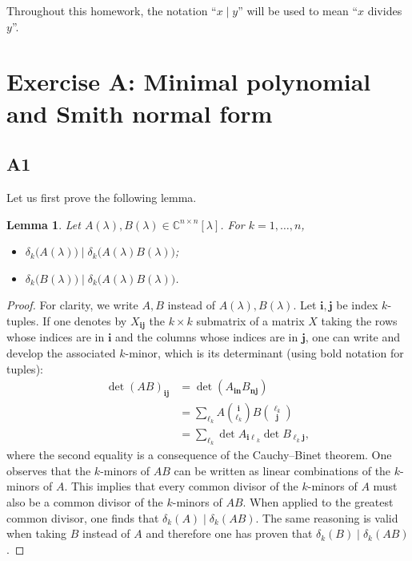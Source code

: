 \documentclass[11pt]{article}
\newtheorem*{lemma}{Lemma}
\newcommand{\complex}{\mathbb{C}} %
\begin{document}
Throughout this homework, the notation ``\(x \mid y\)'' will be used to mean ``\(x\) divides \(y\)''.
\section*{Exercise A: Minimal polynomial and Smith normal form}
\subsection*{A1}
Let us first prove the following lemma.
\begin{lemma}
 Let $A(\lambda), B(\lambda) \in\complex^{n\times n}[\lambda]$.
 For $k=1, \dots, n$,
 \begin{itemize}
     \item $\delta_k\big(A(\lambda)\big) \mid \delta_k\big(A(\lambda)B(\lambda)\big)$;
     \item $\delta_k\big(B(\lambda)\big) \mid \delta_k\big(A(\lambda)B(\lambda)\big)$.
 \end{itemize}
\end{lemma}
\begin{proof}
For clarity, we write \(A, B\) instead of \(A(\lambda), B(\lambda)\).
Let \(\bm{i}, \bm{j}\) be index \(k\)-tuples.
If one denotes by $X_{\bm{ij}}$ the \(k \times k\) submatrix of a matrix $X$ taking the rows whose indices are in $\bm{i}$ and the columns whose indices are in $\bm{j}$, one can write and develop the associated \(k\)-minor, which is its determinant (using bold notation for tuples):
\begin{align*}
    \det (AB)_{\bm{ij}}&=\det(A_{\bm{in}}B_{\bm{nj}})\\
    &=\sum_{\bm{\ell}_k} A\binom{\bm{i}}{\bm{\ell}_k}B\binom{\bm{\ell}_k}{\bm{j}}\\
    &=\sum_{\bm{\ell}_k} \det A_{\bm{i\ell}_k} \det B_{\bm{\ell}_k \bm{j}},
\end{align*}
where the second equality is a consequence of the Cauchy--Binet theorem.
One observes that the \(k\)-minors of $AB$ can be written as linear combinations of the \(k\)-minors of $A$. This implies that every common divisor of the \(k\)-minors of $A$ must also be a common divisor of the \(k\)-minors of $AB$. When applied to the greatest common divisor, one finds that $\delta_k(A) \mid \delta_k(AB)$. The same reasoning is valid when taking $B$ instead of $A$ and therefore one has proven that $\delta_k(B) \mid \delta_k(AB)$.
\end{proof}
\end{document}
